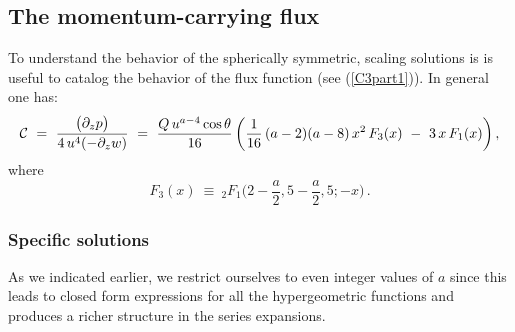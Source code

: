 \documentclass[11pt]{article}
\def\cC{{\cal C}}
\numberwithin{equation}{section}
\begin{document}
\subsection{The momentum-carrying flux}
\label{ss:Asymp}

To understand the behavior of the spherically symmetric, scaling solutions is is useful to catalog the  behavior of the flux function (see (\ref{C3part1})).  In general one has:
% 
\begin{equation}
\cC ~=~   \frac{\big( \partial_z p \big) }  {4\, u^4  (-\partial_z w)}   ~=~   \frac{Q\, u^{a-4}  \cos \theta }{16 } \, \bigg( \frac{1}{16} \,(a-2)(a-8)\, x^2\, F_3(x) ~-~ 3\, x\, F_1(x)  \bigg) \,,
 \label{C3res3}
\end{equation}
%
where
%
\begin{equation}
F_3(x)   ~\equiv~ {}_2F_1 \bigg(2- \frac{a}{2} , 5- \frac{a}{2}  , 5; -x \bigg)  \,.
 \label{F3defn}
\end{equation}
%

\subsubsection{Specific solutions}
\label{ss:LocCsols} 

As we indicated earlier, we  restrict ourselves  to even integer values of $a$ since this leads to closed form expressions  for all the hypergeometric functions and produces a richer structure in the series expansions.  
\end{document}
